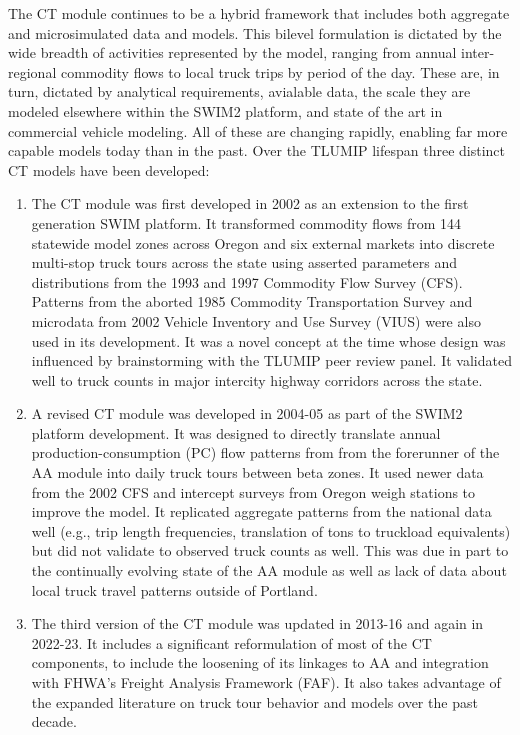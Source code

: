 The CT module continues to be a hybrid framework that includes both aggregate and microsimulated data and models. This bilevel formulation is dictated by the wide breadth of activities represented by the model, ranging from annual inter-regional commodity flows to local truck trips by period of the day. These are, in turn, dictated by analytical requirements, avialable data, the scale they are modeled elsewhere within the SWIM2 platform, and state of the art in commercial vehicle modeling. All of these are changing rapidly, enabling far more capable models today than in the past. Over the TLUMIP lifespan three distinct CT models have been developed:
\begin{enumerate}
    \item The CT module was first developed in 2002 as an extension to the first generation SWIM platform. It transformed commodity flows from 144 statewide model zones across Oregon and six external markets into discrete multi-stop truck tours across the state using asserted parameters and distributions from the 1993 and 1997 Commodity Flow Survey (CFS). Patterns from the aborted 1985 Commodity Transportation Survey and microdata from 2002 Vehicle Inventory and Use Survey (VIUS) were also used in its development. It was a novel concept at the time whose design was influenced by brainstorming with the TLUMIP peer review panel. It validated well to truck counts in major intercity highway corridors across the state. 
    \item A revised CT module was developed in 2004-05 \citep{donnelly07} as part of the SWIM2 platform development. It was designed to directly translate annual production-consumption (PC) flow patterns from from the forerunner of the AA module into daily truck tours between beta zones. It used newer data from the 2002 CFS and intercept surveys from Oregon weigh stations to improve the model. It replicated aggregate patterns from the national data well (e.g., trip length frequencies, translation of tons to truckload equivalents) but did not validate to observed truck counts as well. This was due in part to the continually evolving state of the AA module as well as lack of data about local truck travel patterns outside of Portland.
    \item The third version of the CT module was updated in 2013-16 and again in 2022-23. It includes a significant reformulation of most of the CT components, to include the loosening of its linkages to AA and integration with FHWA's Freight Analysis Framework (FAF). It also takes advantage of the expanded literature on truck tour behavior and models over the past decade.

\end{enumerate}

